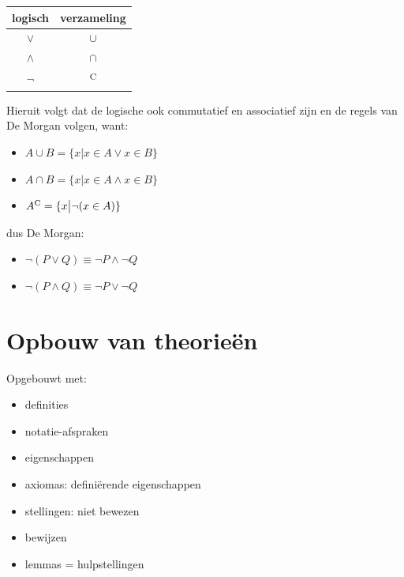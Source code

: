 \documentclass{article}
\begin{document}
\begin{center}
    \begin{tabular}{|c|c|}
    \hline
    logisch & verzameling \\
    \hline
    $\lor$ & $\cup$\\
    $\land$ & $\cap$\\
    $\neg$ & \textsuperscript{C}\\
    \hline
    \end{tabular}
\end{center}
Hieruit volgt dat de logische ook commutatief en associatief zijn en de regels van De Morgan volgen, want:
\begin{itemize}
    \item $A \cup B = \{x \big| x \in A \lor x\in B\}$
    \item $A \cap B = \{x \big| x \in A \land x\in B\}$
    \item $A\textsuperscript{C} = \{x \big| \neg(x \in A)\}$
\end{itemize}
dus De Morgan:
\begin{itemize}
    \item $\neg(P \lor Q) \equiv \neg P \land \neg Q$
    \item $\neg(P \land Q) \equiv \neg P \lor \neg Q$
\end{itemize}
\section{Opbouw van theorieën}
Opgebouwt met:
\begin{itemize}
    \item definities
    \item notatie-afspraken
    \item eigenschappen
    \item axiomas: definiërende eigenschappen
    \item stellingen: niet bewezen
    \item bewijzen
    \item lemmas = hulpstellingen
\end{itemize}
\end{document}
